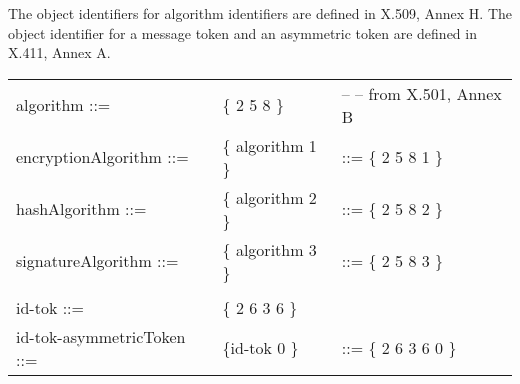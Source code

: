 The object identifiers for algorithm identifiers are defined
in X.509, Annex H.
The object identifier for a message token and an asymmetric token
are defined in X.411, Annex A.
{\small
\begin {center}
\begin {tabular}{lll}
algorithm ::= & \{ 2 5 8 \} & -- -- from X.501, Annex B \\
encryptionAlgorithm ::= & \{ algorithm 1 \} & ::= \{ 2 5 8 1 \} \\
hashAlgorithm ::= & \{ algorithm 2 \} & ::= \{ 2 5 8 2 \} \\
signatureAlgorithm ::= & \{ algorithm 3 \} & ::= \{ 2 5 8 3 \} \\
 & & \\
id-tok ::= & \{ 2 6 3 6 \} & \\
id-tok-asymmetricToken ::= & \{id-tok 0 \} & ::= \{ 2 6 3 6 0 \} \\
\end {tabular}
\end {center}
}

